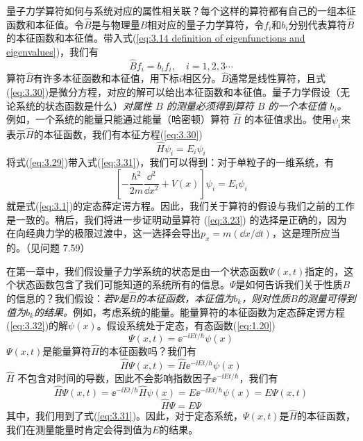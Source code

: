 	量子力学算符如何与系统对应的属性相关联？每个这样的算符都有自己的一组本征函数和本征值。令$\hat{B}$是与物理量$B$相对应的量子力学算符，令$f_i$和$b_i$分别代表算符$\hat{B}$的本征函数和本征值。带入式(\ref{eq:3.14 definition of eigenfunctions and eigenvalues})，我们有
	\begin{equation}
		\hat{B}f_i = b_if_i, \quad i = 1,2,3\cdots
		\label{eq:3.30}
	\end{equation}
	算符$\hat{B}$有许多本征函数和本征值，用下标$i$相区分。$\hat{B}$通常是线性算符，且式(\ref{eq:3.30})是微分方程，对应的解可以给出本征函数和本征值。量子力学假设（无论系统的状态函数是什么）\textit{对属性 $B$ 的测量必须得到算符 $\hat{B}$ 的一个本征值 $b_i$。}例如，一个系统的能量只能通过能量（哈密顿）算符 $\hat{H}$ 的本征值求出。使用$\psi_i$来表示$\hat{H}$的本征函数，我们有本征方程(\ref{eq:3.30})
	\begin{equation}
		\boxed{
			\hat{H}\psi_i = E_i\psi_i
		}
		\label{eq:3.31}
	\end{equation}
	将式(\ref{eq:3.29})带入式(\ref{eq:3.31})，我们可以得到：对于单粒子的一维系统，有
	\begin{equation}
		\left[-\frac{\hbar^2}{2m}\frac{\dd ^2}{\dd x^2}+V\left(x\right)\right]\psi_i = 
		E_i\psi_i
		\label{eq:3.32}
	\end{equation}
	就是式(\ref{eq:3.1})的定态薛定谔方程。因此，我们关于算符的假设与我们之前的工作是一致的。稍后，我们将进一步证明动量算符 (\ref{eq:3.23}) 的选择是正确的，因为在向经典力学的极限过渡中，这一选择会导出$p_x = m\left(\dd x / \dd t\right)$，这是理所应当的。（见问题 7.59）

	在第一章中，我们假设量子力学系统的状态是由一个状态函数$\Psi$$\left(x,t\right)$指定的，这个状态函数包含了我们可能知道的系统所有的信息。$\Psi$是如何告诉我们关于性质$B$的信息的？我们假设：\textit{若$\Psi$是$\hat{B}$的本征函数，本征值为$b_k$，则对性质$B$的测量可得到值为$b_k$的结果。}例如，考虑系统的能量。能量算符的本征函数为定态薛定谔方程(\ref{eq:3.32})的解$\psi\left(x\right)$。假设系统处于定态，有态函数(\ref{eq:1.20})
	\begin{equation}
		\Psi\left(x,t\right) = \ee ^{-\ii Et/\hbar}\psi\left(x\right)
		\label{eq:3.33}
	\end{equation}
	$\Psi\left(x,t\right)$是能量算符$\hat{H}$的本征函数吗？我们有
	\begin{equation*}
		\hat{H}\Psi\left(x,t\right) = \hat{H}\ee ^{-\ii Et/\hbar}\psi\left(x\right)
	\end{equation*}
	$\hat{H}$ 不包含对时间的导数，因此不会影响指数因子$\ee ^{-\ii Et/\hbar}$，我们有
	\begin{equation*}
		\hat{H}\Psi\left(x,t\right) = \ee ^{-\ii Et/\hbar}\hat{H}\psi\left(x\right) = E \ee ^{-\ii Et/\hbar} \psi\left(x\right) = E \Psi\left(x,t\right)
	\end{equation*}
	\begin{equation}
		\hat{H}\Psi = E\Psi
		\label{eq:3.34}
	\end{equation}
	其中，我们用到了式(\ref{eq:3.31})。因此，对于定态系统，$\Psi\left(x,t\right)$是$\hat{H}$的本征函数，我们在测量能量时肯定会得到值为$E$的结果。

